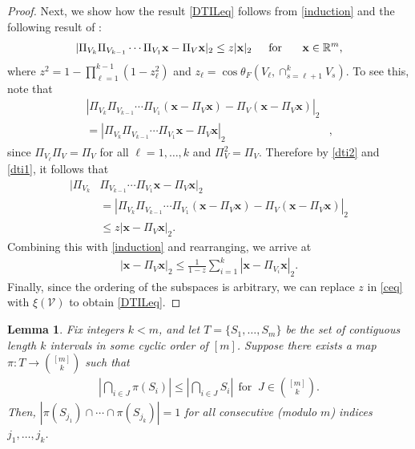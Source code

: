 \documentclass[journal, twocolumn]{IEEEtran}
\newtheorem{lemma}{Lemma}
\begin{document}
\begin{proof}
Next, we show how the result \eqref{DTILeq} follows from \eqref{induction} and the following result of \cite[Theorem 9.33]{Deutsch12}:
\begin{align}\label{dti2}
|\Pi_{V_k}\Pi_{V_{k-1}}\cdots\Pi_{V_1} \mathbf{x} - \Pi_V\mathbf{x}|_2 \leq z |\mathbf{x}|_2 \indent \text{for } \indent \mathbf{x} \in \mathbb{R}^m,
\end{align}
where $z^2= 1 - \prod_{\ell =1}^{k-1}(1-z_{\ell}^2)$ and $z_{\ell} = \cos\theta_F\left(V_{\ell}, \cap_{s=\ell+1}^k V_s\right)$. To see this, note that
\begin{align}\label{dti1}
|\Pi_{V_k}\Pi_{V_{k-1}}\cdots\Pi_{V_1}(\mathbf{x} - \Pi_V\mathbf{x}) - \Pi_V(\mathbf{x} - \Pi_V\mathbf{x})|_2& \\
= |\Pi_{V_k}\Pi_{V_{k-1}}\cdots\Pi_{V_1} \mathbf{x} - \Pi_V \mathbf{x} |_2&,
\end{align}
since $\Pi_{V_\ell} \Pi_V = \Pi_V$ for all $\ell = 1, \ldots, k$ and $\Pi_V^2 = \Pi_V$.
Therefore by \eqref{dti2} and \eqref{dti1}, it follows that
\begin{align*}
|\Pi_{V_k}&\Pi_{V_{k-1}}\cdots\Pi_{V_1} \mathbf{x} - \Pi_V \mathbf{x} |_2 \\
&= |\Pi_{V_k}\Pi_{V_{k-1}}\cdots\Pi_{V_1}(\mathbf{x} - \Pi_V\mathbf{x}) - \Pi_V(\mathbf{x} - \Pi_V\mathbf{x})|_2 \\
&\leq z |\mathbf{x} - \Pi_V\mathbf{x}|_2.
\end{align*}
Combining this with \eqref{induction} and rearranging, we arrive at
\begin{align}\label{ceq}
|\mathbf{x} - \Pi_V \mathbf{x}|_2 \leq \frac{1}{1 - z} \sum_{i=1}^k |\mathbf{x} - \Pi_{V_i} \mathbf{x}|_2.
\end{align}
Finally, since the ordering of the subspaces is arbitrary, we can replace $z$ in \eqref{ceq} with $\xi(\mathcal{V})$ to obtain \eqref{DTILeq}.
\end{proof}


\begin{lemma}\label{NonEmptyLemma} Fix integers $k < m$, and let $T = \{S_1, \ldots, S_m\}$ be the set of contiguous length $k$ intervals in some cyclic order of $[m]$. Suppose there exists a map $\pi: T \to {[m] \choose k}$ such that
\begin{align}\label{NonEmpty}
|\bigcap_{i \in J} \pi(S_i)| \leq |\bigcap_{i \in J} S_i | \ \ \text{for } \ J \in {[m] \choose k}.
\end{align}
%
Then, $|\pi(S_{j_1}) \cap \cdots \cap \pi(S_{j_k})| = 1$ for all consecutive (modulo $m$) indices $j_1,\ldots,j_k$.
\end{lemma}
\end{document}
